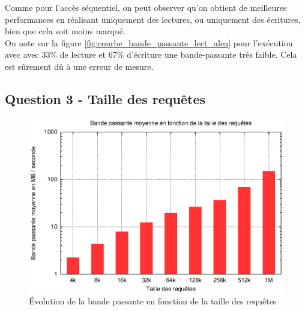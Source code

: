 \documentclass[a4paper]{article}
\begin{document}
\FloatBarrier

Comme pour l'accès séquentiel, on peut observer qu'on obtient de meilleures performances en réalisant uniquement des lectures, ou uniquement des écritures, bien que cela soit moins marqué.\\
On note sur la figure \ref{fig:courbe_bande_passante_lect_alea} pour l'exécution avec avec 33\% de lecture et 67\% d'écriture une bande-passante très faible. Cela est sûrement dû à une erreur de mesure. 


\newpage
\subsection{Question 3 - Taille des requêtes}

\begin{figure}[h]
	\begin{center}
		\includegraphics[scale=0.70]{Question3/bande_passante_moyenne.eps}
	\end{center}
   	\caption{Évolution de la bande passante en fonction de la taille des requêtes}
	\label{fig:courbe_bande_passante_taille}
\end{figure}

\FloatBarrier
\end{document}
